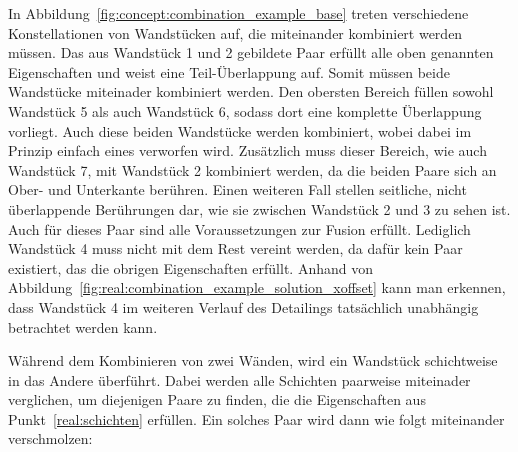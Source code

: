 In Abbildung~\ref{fig:concept:combination_example_base} treten verschiedene Konstellationen von Wandstücken auf, die miteinander kombiniert werden müssen.
Das aus Wandstück 1 und 2 gebildete Paar erfüllt alle oben genannten Eigenschaften und weist eine Teil-Überlappung auf.
Somit müssen beide Wandstücke miteinader kombiniert werden.
Den obersten Bereich füllen sowohl Wandstück 5 als auch Wandstück 6, sodass dort eine komplette Überlappung vorliegt.
Auch diese beiden Wandstücke werden kombiniert, wobei dabei im Prinzip einfach eines verworfen wird.
Zusätzlich muss dieser Bereich, wie auch Wandstück 7, mit Wandstück 2 kombiniert werden, da die beiden Paare sich an Ober- und Unterkante berühren.
Einen weiteren Fall stellen seitliche, nicht überlappende Berührungen dar, wie sie zwischen Wandstück 2 und 3 zu sehen ist.
Auch für dieses Paar sind alle Voraussetzungen zur Fusion erfüllt.
Lediglich Wandstück 4 muss nicht mit dem Rest vereint werden, da dafür kein Paar existiert, das die obrigen Eigenschaften erfüllt.
Anhand von Abbildung~\ref{fig:real:combination_example_solution_xoffset} kann man erkennen, dass Wandstück 4 im weiteren Verlauf des Detailings tatsächlich unabhängig betrachtet werden kann. 

Während dem Kombinieren von zwei Wänden, wird ein Wandstück schichtweise in das Andere überführt.
Dabei werden alle Schichten paarweise miteinader verglichen, um diejenigen Paare zu finden, die die Eigenschaften aus Punkt~\ref{real:schichten} erfüllen.
Ein solches Paar wird dann wie folgt miteinander verschmolzen:

